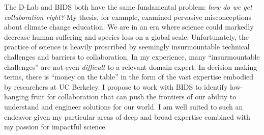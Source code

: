 

\lehead[]{\pagemark}
\rohead[]{\pagemark}

% 



\manualmark
\pagestyle{scrheadings}
\markleft{}

The D-Lab and BIDS both have the same fundamental problem: \emph{how do we get
collaboration right?} My thesis, for example, examined pervasive misconceptions
about climate change education. We are in an era where science could markedly
decrease human suffering and species loss on a global scale. Unfortunately, the
practice of science is heavily proscribed by seemingly insurmountable technical
challenges and barriers to collaboration. In my experience, many “insurmountable
challenges” are not even \emph{difficult} to a relevant domain expert. In
decision making terms, there is “money on the table” in the form of the vast
expertise embodied by researchers at UC Berkeley. I propose to work with BIDS to
identify low-hanging fruit for collaboration that can push the frontiers of our
ability to understand and engineer solutions for our world. I am well suited to
such an endeavor given my particular areas of deep and broad expertise combined with my
passion for impactful science.




